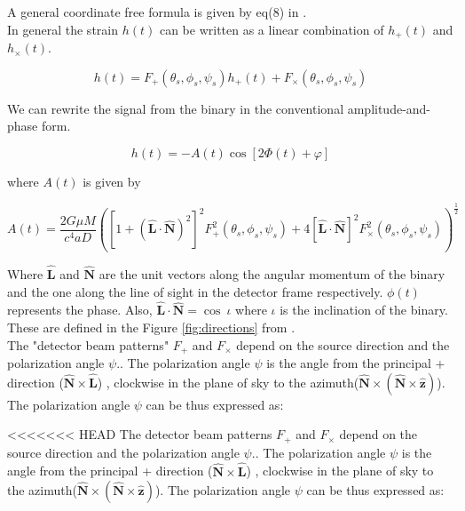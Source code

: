 \documentclass[10pt,a4paper]{article}
\begin{document}
A general coordinate free formula is given by eq(8) in \cite{cornish}.\\
 
In general the strain $h(t)$ can be written as a linear combination of $h_{+}(t)$ and $h_{\times}(t)$.

\begin{equation}
h(t) = F_{+}(\theta_s,\phi_s,\psi_s) h_{+}(t) + F_{\times}(\theta_s,\phi_s,\psi_s)
\end{equation}

We can rewrite the signal from the binary in the conventional amplitude-and-phase form.

\begin{equation}
h(t) = -A(t) \cos[2\Phi(t) +\varphi]
\end{equation}

where $A(t)$ is given by



\begin{equation}
A(t) = \frac{2 G \mu M}{c^4 a D}\left([1+(\hat{\textbf{L}} \cdot \hat{\textbf{N}})^2]^2 F_{+}^2(\theta_s,\phi_s,\psi_s) + 4[\hat{\textbf{L}} \cdot \hat{\textbf{N}}]^2 F_{\times}^2(\theta_s,\phi_s,\psi_s) \right)^{\frac{1}{2}}
\end{equation}

Where $\hat{\textbf{L}}$ and $\hat{\textbf{N}}$ are the unit vectors along the angular momentum of the binary and the one along the line of sight in the detector frame respectively. $\phi(t)$ represents the phase. 
Also, $\hat{\textbf{L}} \cdot \hat{\textbf{N}} = \cos \ \iota$ where $\iota$ is the inclination of the binary. These are defined in the Figure \ref{fig:directions} from \citep{ACST}.\\ 

The "detector beam patterns" $F_{+}$ and $F_{\times}$ depend on the source direction and the  polarization angle $\psi$.\citep{cutler}. The polarization angle $\psi$ is the angle from the principal + direction ($\hat{\textbf{N}} \times \hat{\textbf{L}}$) , clockwise in the plane of sky to the azimuth($\hat{\textbf{N}} \times (\hat{\textbf{N}} \times \hat{\textbf{z}})$). The polarization angle $\psi$ can be thus expressed as:

<<<<<<< HEAD
The detector beam patterns $F_{+}$ and $F_{\times}$ depend on the source direction and the  polarization angle $\psi$.\citep{cutler}. The polarization angle $\psi$ is the angle from the principal + direction ($\hat{\textbf{N}} \times \hat{\textbf{L}}$) , clockwise in the plane of sky to the azimuth($\hat{\textbf{N}} \times (\hat{\textbf{N}} \times \hat{\textbf{z}})$). The polarization angle $\psi$ can be thus expressed as:
\end{document}
